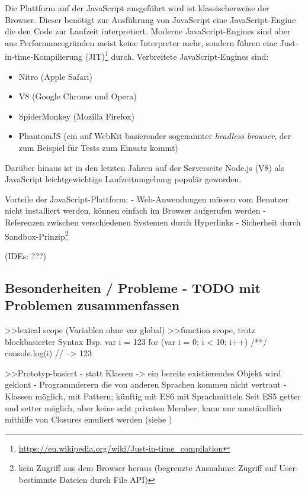 \documentclass[a4paper, 12pt, listof=totoc, bibliography=totoc]{scrreprt}
\begin{document}
Die Plattform auf der JavaScript ausgeführt wird ist klassischerweise der Browser. Dieser benötigt zur Ausführung von JavaScript eine JavaScript-Engine die den Code zur Laufzeit interpretiert. Moderne JavaScript-Engines sind aber aus Performancegründen meist keine Interpreter mehr, sondern führen eine Just-in-time-Kompilierung (JIT)\footnote{
	\url{https://en.wikipedia.org/wiki/Just-in-time_compilation}
} durch. Verbreitete JavaScript-Engines sind:

\begin{itemize}
	\item Nitro (Apple Safari)
	\item V8 (Google Chrome und Opera)
	\item SpiderMonkey (Mozilla Firefox)
	\item PhantomJS (ein auf WebKit basierender sogenannter \textit{headless browser}, der zum Beispiel für Tests zum Einsatz kommt)
\end{itemize}

Darüber hinaus ist in den letzten Jahren auf der Serverseite Node.js (V8) als JavaScript leichtgewichtige Laufzeitumgebung populär geworden.

Vorteile der JavaScript-Plattform:
- Web-Anwendungen müssen vom Benutzer nicht installiert werden, können einfach im Browser aufgerufen werden
- Referenzen zwischen verschiedenen Systemen durch Hyperlinks
- Sicherheit durch Sandbox-Prinzip\footnote{
	kein Zugriff aus dem Browser heraus (begrenzte Ausnahme: Zugriff auf User-bestimmte Dateien durch File API)}
\cite{haoyi.HOS}

(IDEs: ???)


\subsection{Besonderheiten / Probleme - TODO mit Problemen zusammenfassen}

>>lexical scope (Variablen ohne var global)
>>function scope, trotz blockbasierter Syntax
Bsp.
var i = 123
for (var i = 0; i < 10; i++) { /**/ }
console.log(i) // --> 123

>>Prototyp-basiert
- statt Klassen
-> ein bereits existierendes Objekt wird geklont
- Programmierern die von anderen Sprachen kommen nicht vertraut
- Klassen möglich, mit Pattern; künftig mit ES6 mit Sprachmitteln
Seit ES5 getter und setter möglich, aber keine echt privaten Member, kann nur umständlich mithilfe von Closures emuliert werden
(siehe \cite[S. 226]{flanagan2011.JDG})
\end{document}
